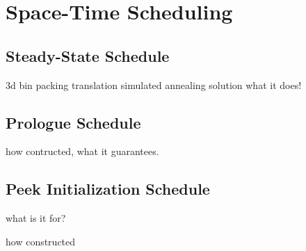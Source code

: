 \section{Space-Time Scheduling}
\label{sec:scheduling}
\subsection{Steady-State Schedule}
3d bin packing translation
simulated annealing solution
what it does!

\subsection{Prologue Schedule}
how contructed, what it guarantees.

\subsection{Peek Initialization Schedule}
what is it for?

how constructed



